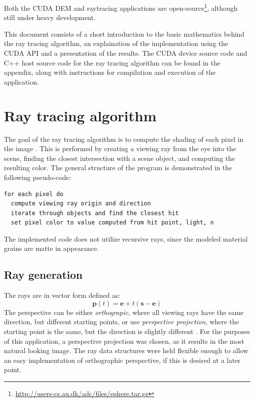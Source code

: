 \documentclass[journal]{IEEEtran}
\begin{document}
Both the CUDA DEM and raytracing applications are open-source\footnote{\url{http://users-cs.au.dk/adc/files/sphere.tar.gz}}, although still under heavy development. 

This document consists of a short introduction to the basic mathematics behind the ray tracing algorithm, an explaination of the implementation using the CUDA API \cite{Nvidia-1:2010} and a presentation of the results. The CUDA device source code  and C++ host source code for the ray tracing algorithm can be found in the appendix, along with instructions for compilation and execution of the application.


\section{Ray tracing algorithm}
The goal of the ray tracing algorithm is to compute the shading of each pixel in the image \cite{Shirley:2009}. This is performed by creating a viewing ray from the eye into the scene, finding the closest intersection with a scene object, and computing the resulting color. The general structure of the program is demonstrated in the following pseudo-code:
\begin{lstlisting}[basicstyle=\footnotesize]
for each pixel do
  compute viewing ray origin and direction
  iterate through objects and find the closest hit
  set pixel color to value computed from hit point, light, n
\end{lstlisting}
The implemented code does not utilize recursive rays, since the modeled material grains are matte in appearance.

\subsection{Ray generation}
The rays are in vector form defined as:
\begin{equation}
  \mathbf{p}(t) = \mathbf{e} + t(\mathbf{s} - \mathbf{e})
  \label{eq:raygen}
\end{equation}
The perspective can be either \emph{orthograpic}, where all viewing rays have the same direction, but different starting points, or use \emph{perspective projection}, where the starting point is the same, but the direction is slightly different \cite{Shirley:2009}. For the purposes of this application, a perspective projection was chosen, as it results in the most natural looking image. The ray data structures were held flexible enough to allow an easy implementation of orthographic perspective, if this is desired at a later point.
\end{document}

